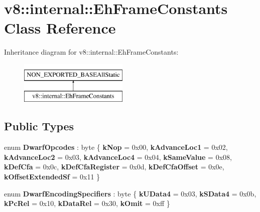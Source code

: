\hypertarget{classv8_1_1internal_1_1EhFrameConstants}{}\section{v8\+:\+:internal\+:\+:Eh\+Frame\+Constants Class Reference}
\label{classv8_1_1internal_1_1EhFrameConstants}
Inheritance diagram for v8\+:\+:internal\+:\+:Eh\+Frame\+Constants\+:\begin{figure}[H]
\begin{center}
\leavevmode
\includegraphics[height=2.000000cm]{classv8_1_1internal_1_1EhFrameConstants}
\end{center}
\end{figure}
\subsection*{Public Types}
\begin{DoxyCompactItemize}
\item 
\mbox{\label{classv8_1_1internal_1_1EhFrameConstants_ad159a4032d7187f97e4258f060dfaa1b}} 
enum {\bfseries Dwarf\+Opcodes} \+: byte \{ \newline
{\bfseries k\+Nop} = 0x00, 
{\bfseries k\+Advance\+Loc1} = 0x02, 
{\bfseries k\+Advance\+Loc2} = 0x03, 
{\bfseries k\+Advance\+Loc4} = 0x04, 
\newline
{\bfseries k\+Same\+Value} = 0x08, 
{\bfseries k\+Def\+Cfa} = 0x0c, 
{\bfseries k\+Def\+Cfa\+Register} = 0x0d, 
{\bfseries k\+Def\+Cfa\+Offset} = 0x0e, 
\newline
{\bfseries k\+Offset\+Extended\+Sf} = 0x11
 \}
\item 
\mbox{\label{classv8_1_1internal_1_1EhFrameConstants_a6d94888045a4a5a94f55edfbd2af2f1c}} 
enum {\bfseries Dwarf\+Encoding\+Specifiers} \+: byte \{ \newline
{\bfseries k\+U\+Data4} = 0x03, 
{\bfseries k\+S\+Data4} = 0x0b, 
{\bfseries k\+Pc\+Rel} = 0x10, 
{\bfseries k\+Data\+Rel} = 0x30, 
\newline
{\bfseries k\+Omit} = 0xff
 \}
\end{DoxyCompactItemize}

